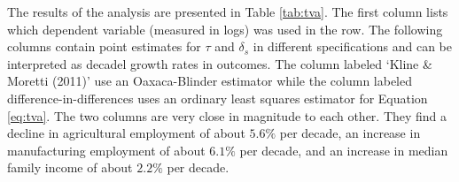 \documentclass[11pt]{article}
\begin{document}
The results of the analysis are presented in Table \ref{tab:tva}. The first column lists which dependent variable (measured in logs) was used in the row. The following columns contain point estimates for $\tau$ and $\delta_s$ in different specifications and can be interpreted as decadel growth rates in outcomes. The column labeled `Kline \& Moretti (2011)' use an Oaxaca-Blinder estimator while the column labeled difference-in-differences uses an ordinary least squares estimator for Equation \ref{eq:tva}. The two columns are very close in magnitude to each other. They find a decline in agricultural employment of about $5.6\%$ per decade, an increase in manufacturing employment of about $6.1\%$ per decade, and an increase in median family income of about $2.2\%$ per decade. 


\end{document}
